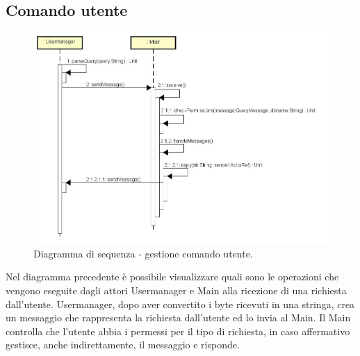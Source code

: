 \documentclass[a4paper]{article}
\begin{document}
        \subsection{Comando utente}
            \begin{figure} [H]
				\centering
				\includegraphics[width=\textwidth]{ST/Sequenza/seqComandoUtente.jpg}
				\caption{Diagramma di sequenza - gestione comando utente.}
			\end{figure}
            Nel diagramma precedente è possibile visualizzare quali sono le operazioni che vengono eseguite dagli attori Usermanager e Main alla ricezione di una richiesta dall'utente. 
Usermanager, dopo aver convertito i byte ricevuti in una stringa, crea un messaggio che rappresenta la richiesta dall'utente ed lo invia al Main. Il Main controlla che l'utente abbia i permessi per il tipo di richiesta, in caso affermativo gestisce, anche indirettamente, il messaggio e risponde.             
            
\end{document}
